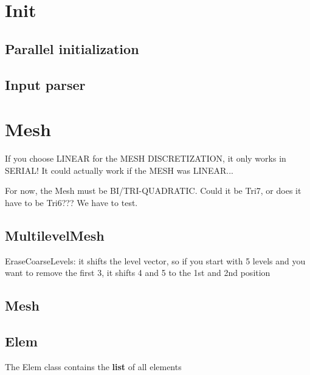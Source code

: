 \documentclass[10pt]{book}
\begin{document}
   
 \chapter{Init}

   \section{Parallel initialization}
   
   \section{Input parser}
   
 
 
 
 \chapter{ Mesh }

    
 If you choose LINEAR for the MESH DISCRETIZATION, it only works in SERIAL! It could actually work if the MESH was LINEAR...
 
 For now, the Mesh must be BI/TRI-QUADRATIC. Could it be Tri7, or does it have to be Tri6??? We have to test.
 
 
   
     \section{MultilevelMesh}
   
  EraseCoarseLevels: it shifts the level vector, 
   so if you start with 5 levels and you want to remove the first 3,
   it shifts 4 and 5 to the 1st and 2nd position 
   
   \section{Mesh}
   
 \section{Elem}
  
  The Elem class contains the \textbf{list} of all elements
  
  
  
\end{document}
